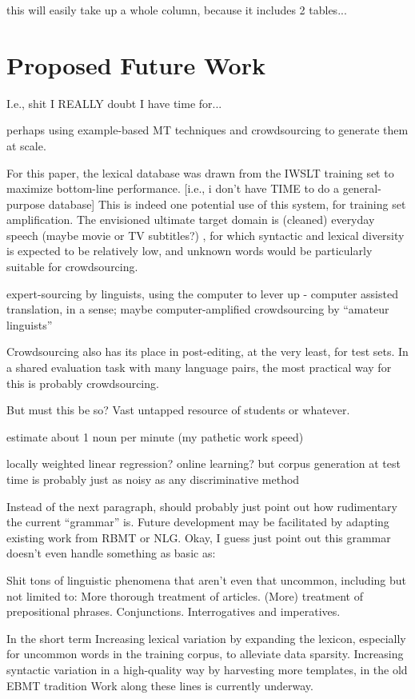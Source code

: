 this will easily take up a whole column, because it includes 2 tables...

\section{Proposed Future Work}

I.e., shit I REALLY doubt I have time for...


perhaps using example-based MT techniques  and crowdsourcing to generate them at scale.

For this paper, the lexical database was drawn from the IWSLT training set to maximize bottom-line performance.
[i.e., i don't have TIME to do a general-purpose database]
This is indeed one potential use of this system, for training set amplification.
The envisioned ultimate target domain is (cleaned) everyday speech (maybe movie or TV subtitles?) , for which syntactic and lexical diversity is expected to be relatively low, and unknown words would be particularly suitable for crowdsourcing.

expert-sourcing by linguists, using the computer to lever up - computer assisted translation, in a sense; maybe computer-amplified
crowdsourcing by ``amateur linguists''

Crowdsourcing also has its place in post-editing, at the very least, for test sets.
In a shared evaluation task with many language pairs, the most practical way for this is probably crowdsourcing.

But must this be so? Vast untapped resource of students or whatever.

estimate about 1 noun per minute (my pathetic work speed)

locally weighted linear regression? online learning?
but corpus generation at test time is probably just as noisy as any discriminative method

Instead of the next paragraph, should probably just point out how rudimentary the current ``grammar'' is. 
Future development may be facilitated by adapting existing work from RBMT or NLG. 
Okay, I guess just point out this grammar doesn't even handle something as basic as:

Shit tons of linguistic phenomena that aren't even that uncommon, including but not limited to:
More thorough treatment of articles.
(More) treatment of prepositional phrases.
Conjunctions.
Interrogatives and imperatives.


In the short term
Increasing lexical variation by expanding the lexicon, especially for uncommon words in the training corpus, to alleviate data sparsity.
Increasing syntactic variation in a high-quality way by harvesting more templates, in the old EBMT tradition
Work along these lines is currently underway.


